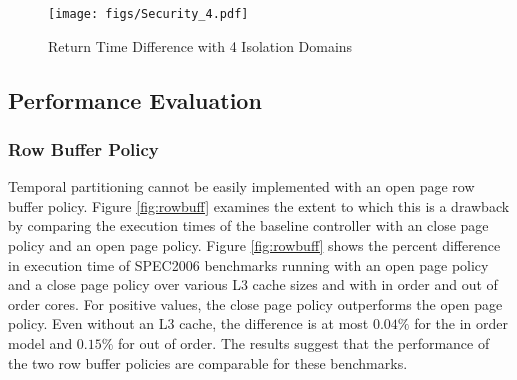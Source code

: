 \begin{figure}%
    \begin{center}
        \texttt{[image: figs/Security\_4.pdf]}
        \caption{Return Time Difference with 4 Isolation Domains}
        \label{fig:Security_4}
        \vspace{-0.20in}
    \end{center}
\end{figure}

\subsection{Performance Evaluation}

\subsubsection{Row Buffer Policy}

Temporal partitioning cannot be easily implemented with an open page row buffer 
policy. Figure \ref{fig:rowbuff} examines the extent to which this is a drawback by comparing the execution times of the baseline controller with an 
close page policy and an open page policy. Figure 
\ref{fig:rowbuff} shows the percent difference in execution time 
of SPEC2006 benchmarks running with an open page policy and a close page 
policy over various L3 cache sizes %
and with in order and out of order cores. For 
positive values, the close page policy outperforms the open page policy. Even 
without an L3 cache, the difference is at most $0.04\%$ for the in order model and 
$0.15\%$ for out of order. The results suggest that the performance of the two
row buffer policies are comparable for these benchmarks.

\begin{figure*}
    \begin{center}
        \vspace{-0.10in}
        \caption{Effect of Row Buffer Policy on Execution Time.}
        \label{fig:rowbuff}
    \end{center}
\end{figure*}

